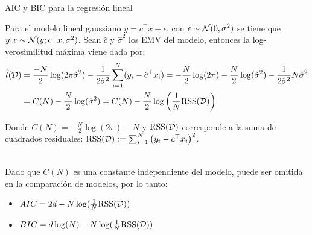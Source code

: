 \documentclass[9pt]{beamer}
\begin{document}
\begin{frame}{AIC y BIC para la regresión lineal}

Para el modelo lineal gaussiano $ y = c^\top x + \epsilon$, con $\epsilon\sim{\mathcal N}(0,\sigma^2)$ se tiene que $y|x \sim {\mathcal N}(y;c^\top x,\sigma^2)$. Sean $\hat{c}$ y $\hat{\sigma}^2$ los EMV del modelo, entonces la log-verosimilitud máxima viene dada por:
\begin{align*}
	\hat{l}({\mathcal D}) &= \frac{-N}{2}\log(2\pi\hat{\sigma}^2) - \frac{1}{2\hat{\sigma}^2} \sum_{i=1}^N( y_i-\hat{c}^\top x_i)= -\frac{N}{2}\log(2\pi) - \frac{N}{2}\log(\hat{\sigma}^2) - \frac{1}{2\hat{\sigma}^2}  N\hat{\sigma}^2\\
	&= C(N) - \frac{N}{2}\log(\hat{\sigma}^2) = C(N)- \frac{N}{2}\log\left(\frac{1}{N}\text{RSS}({\mathcal D})\right)
\end{align*} 

Donde $C(N) = -\frac{N}{2}\log(2\pi) - N$ y $\text{RSS}({\mathcal D})$ corresponde a la suma de cuadrados residuales: $\text{RSS}({\mathcal D}) := \sum_{i=1}^N \left(y_i - c^\top x_i\right)^2$.\\~\ \pause

Dado que $C(N)$ es una constante independiente del modelo, puede ser omitida en la comparación de modelos, por lo tanto:

\begin{itemize}
	\item $AIC=2d-N\log(\frac{1}{N}\text{RSS}({\mathcal D}))$
	\item $BIC = d\log(N) - N\log(\frac{1}{N}\text{RSS}({\mathcal D}))$
\end{itemize}
	
\end{frame}
\end{document}
